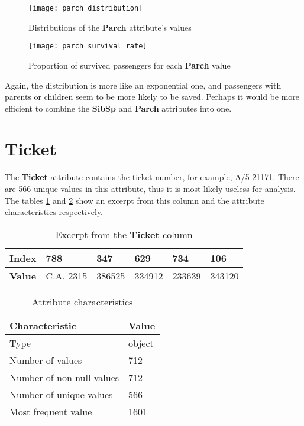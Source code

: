 \begin{figure}[!hp]
    \centering
    \texttt{[image: parch\_distribution]}
    \caption{Distributions of the \textbf{Parch} attribute's values}
    \label{pic:parch_distribution}
\end{figure}

\begin{figure}[!hp]
    \centering
    \texttt{[image: parch\_survival\_rate]}
    \caption{Proportion of survived passengers for each \textbf{Parch} value}
    \label{pic:parch_survival_rate}
\end{figure}

Again, the distribution is more like an exponential one, and passengers 
with parents or children seem to be more likely to be saved. Perhaps it 
would be more efficient to combine the \textbf{SibSp} and \textbf{Parch} 
attributes into one.


\section{Ticket} \label{section:Ticket}
The \textbf{Ticket} attribute contains the ticket number, for example, 
A/5 21171. There are 566 unique values in this attribute, thus it is most
likely useless for analysis. The tables \ref{table:ticket_head} and 
\ref{table:ticket_characteristics} show an excerpt from this column and 
the attribute characteristics respectively.

\begin{table}[!hp]
    \centering
    \caption{Excerpt from the \textbf{Ticket} column}
    \begin{tabular}{|l|l|l|l|l|l|}
        \hline
        \textbf{Index} & 788       & 347    & 629    & 734    & 106    \\ \hline
        \textbf{Value} & C.A. 2315 & 386525 & 334912 & 233639 & 343120 \\ \hline
    \end{tabular}
    \label{table:ticket_head}
\end{table}

\begin{table}[!hp]
    \centering
    \caption{Attribute characteristics}
    \begin{tabular}{|l|l|}
        \hline
        \textbf{Characteristic}   & \textbf{Value} \\ \hline
        Type                      & object         \\ \hline
        Number of values          & 712            \\ \hline
        Number of non-null values & 712            \\ \hline
        Number of unique values   & 566            \\ \hline
        Most frequent value       & 1601           \\ \hline
    \end{tabular}
    \label{table:ticket_characteristics}
\end{table}


